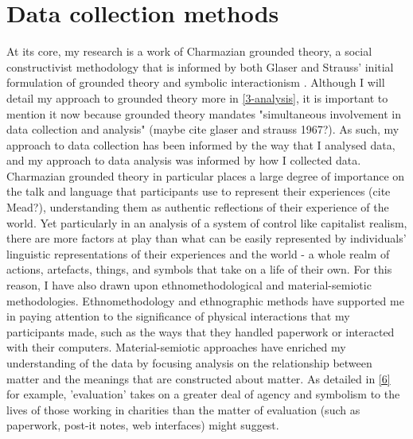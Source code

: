 
\section{Data collection methods}
\label{3-collection}
At its core, my research is a work of Charmazian grounded theory, a social constructivist methodology that is informed by both Glaser and Strauss' initial formulation of grounded theory and symbolic interactionism \cite{charmaz_constructing_2006}. Although I will detail my approach to grounded theory more in \ref{3-analysis}, it is important to mention it now because grounded theory mandates "simultaneous involvement in data collection and analysis" (maybe cite glaser and strauss 1967?). As such, my approach to data collection has been informed by the way that I analysed data, and my approach to data analysis was informed by how I collected data. Charmazian grounded theory in particular places a large degree of importance on the talk and language that participants use to represent their experiences (cite Mead?), understanding them as authentic reflections of their experience of the world. Yet particularly in an analysis of a system of control like capitalist realism, there are more factors at play than what can be easily represented by individuals' linguistic representations of their experiences and the world - a whole realm of actions, artefacts, things, and symbols that take on a life of their own. For this reason, I have also drawn upon ethnomethodological and material-semiotic methodologies. Ethnomethodology and ethnographic methods have supported me in paying attention to the significance of physical interactions that my participants made, such as the ways that they handled paperwork or interacted with their computers. Material-semiotic approaches have enriched my understanding of the data by focusing analysis on the relationship between matter and the meanings that are constructed about matter. As detailed in \ref{6} for example, 'evaluation' takes on a greater deal of agency and symbolism to the lives of those working in charities than the matter of evaluation (such as paperwork, post-it notes, web interfaces) might suggest. 

